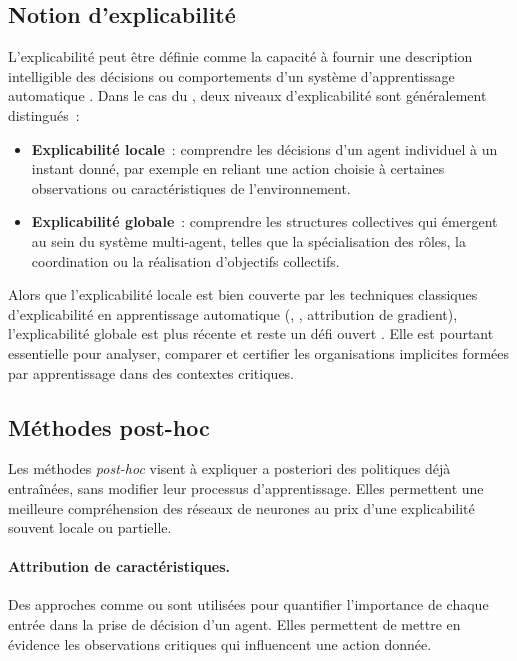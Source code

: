 \subsection{Notion d’explicabilité}

\noindent
L’explicabilité peut être définie comme la capacité à fournir une description intelligible
des décisions ou comportements d’un système d’apprentissage automatique \cite{doshivelez2017rigorous}.
Dans le cas du , deux niveaux d’explicabilité sont généralement distingués~:
\begin{itemize}
  \item \textbf{Explicabilité locale}~: comprendre les décisions d’un agent individuel
        à un instant donné, par exemple en reliant une action choisie
        à certaines observations ou caractéristiques de l’environnement.
  \item \textbf{Explicabilité globale}~: comprendre les structures collectives
        qui émergent au sein du système multi-agent, telles que la spécialisation
        des rôles, la coordination ou la réalisation d’objectifs collectifs.
\end{itemize}

Alors que l’explicabilité locale est bien couverte par les techniques classiques
d’explicabilité en apprentissage automatique (, , attribution de gradient),
l’explicabilité globale est plus récente et reste un défi ouvert
\cite{poupart2025perspectives, milani2022maviper}.
Elle est pourtant essentielle pour analyser, comparer et certifier
les organisations implicites formées par apprentissage dans des contextes critiques.

\subsection{Méthodes post-hoc}

\noindent
Les méthodes \textit{post-hoc} visent à expliquer a posteriori des politiques déjà entraînées,
sans modifier leur processus d’apprentissage.
Elles permettent une meilleure compréhension des réseaux de neurones
au prix d’une explicabilité souvent locale ou partielle.

\paragraph{Attribution de caractéristiques.}
Des approches comme  \cite{bach2015lrp}
ou  \cite{lundberg2017unified}
sont utilisées pour quantifier l’importance de chaque entrée
dans la prise de décision d’un agent.
Elles permettent de mettre en évidence les observations critiques
qui influencent une action donnée.

